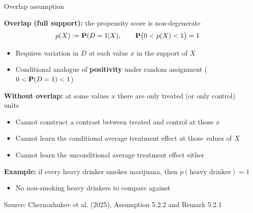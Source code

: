 \documentclass[compress, 8pt]{beamer}
\begin{document}
\begin{frame}{Overlap assumption}

\textbf{Overlap (full support):} the propensity score is non-degenerate
\begin{equation*}
    p(X) := \mathbf{P}(D = 1 \vert X), \qquad \mathbf{P}\big(0 < p(X) < 1\big) = 1
\end{equation*}
\begin{itemize}
    \item Requires variation in $D$ at each value $x$ in the support of $X$
    \item Conditional analogue of \textbf{positivity} under random assignment ($0 < \mathbf{P}(D=1) < 1$)
\end{itemize}

\pause
\vspace{2ex}
\textbf{Without overlap:} at some values $x$ there are only treated (or only control) units
\begin{itemize}
    \item Cannot construct a contrast between treated and control at those $x$
    \item[$\implies$] Cannot learn the conditional average treatment effect at those values of $X$
    \item[$\implies$] Cannot learn the unconditional average treatment effect either
\end{itemize}

\pause
\vspace{2ex}
\textbf{Example:} if every heavy drinker smokes marijuana, then $p(\text{heavy drinker}) = 1$
\begin{itemize}
    \item No non-smoking heavy drinkers to compare against
\end{itemize}

\vspace{2ex}
{\footnotesize Source: Chernozhukov et al. (2025), Assumption 5.2.2 and Remark 5.2.1}
\end{frame}
\end{document}
